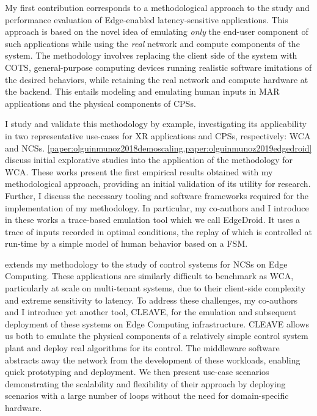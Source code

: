 \medskip

My first contribution corresponds to a methodological approach to the study and performance evaluation of Edge-enabled latency-sensitive applications. 
This approach is based on the novel idea of emulating \emph{only} the end-user component of such applications while using the \emph{real} network and compute components of the system.
The methodology involves replacing the client side of the system with \gls{COTS}, general-purpose computing devices running realistic software imitations of the desired behaviors, while retaining the real network and compute hardware at the backend.
This entails modeling and emulating human inputs in \gls{MAR} applications and the physical components of \glspl{CPS}.

I study and validate this methodology by example, investigating its applicability in two representative use-cases for \gls{XR} applications and \glspl{CPS}, respectively: \acf{WCA} and \acfp{NCS}.
\cref{paper:olguinmunoz2018demoscaling,paper:olguinmunoz2019edgedroid} discuss initial explorative studies into the application of the methodology for \gls{WCA}.
These works present the first empirical results obtained with my methodological approach, providing an initial validation of its utility for research.
Further, I discuss the necessary tooling and software frameworks required for the implementation of my methodology.
In particular, my co-authors and I introduce in these works a trace-based emulation tool which we call EdgeDroid.
It uses a trace of inputs recorded in optimal conditions, the replay of which is controlled at run-time by a simple model of human behavior based on a \gls{FSM}.

 extends my methodology to the study of control systems for \glspl{NCS} on Edge Computing.
These applications are similarly difficult to benchmark as \gls{WCA}, particularly at scale on multi-tenant systems, due to their client-side complexity and extreme sensitivity to latency.
To address these challenges, my co-authors and I introduce yet another tool, \gls{CLEAVE}, for the emulation and subsequent deployment of these systems on Edge Computing infrastructure.
\gls{CLEAVE} allows us both to emulate the physical components of a relatively simple control system plant and deploy real algorithms for its control.
The middleware software abstracts away the network from the development of these workloads, enabling quick prototyping and deployment.
We then present use-case scenarios demonstrating the scalability and flexibility of their approach by deploying scenarios with a large number of loops without the need for domain-specific hardware.

